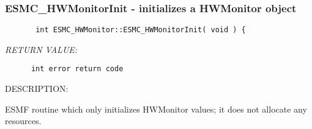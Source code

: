  
\parskip        0pt
\parindent      0pt
\baselineskip  11pt
 
\def\bv{\begin{verbatim}}
\def\ev{\end{verbatim}}
\def\be{\begin{equation}}
\def\ee{\end{equation}}
\def\bea{\begin{eqnarray}}
\def\eea{\end{eqnarray}}
\def\bi{\begin{itemize}}
\def\ei{\end{itemize}}
\def\bn{\begin{enumerate}}
\def\en{\end{enumerate}}
\def\bd{\begin{description}}
\def\ed{\end{description}}
\def\({\left (}
\def\){\right )}
\def\[{\left [}
\def\]{\right ]}
\def\<{\left  \langle}
\def\>{\right \rangle}
\def\cI{{\cal I}}
\def\diag{\mathop{\rm diag}}
\def\tr{\mathop{\rm tr}}


 
\subsubsection{ESMC\_HWMonitorInit - initializes a HWMonitor object}


  
\begin{verbatim}       int ESMC_HWMonitor::ESMC_HWMonitorInit( void ) {\end{verbatim}{\em RETURN VALUE:}
\begin{verbatim}      int error return code\end{verbatim}
{\sf DESCRIPTION:\\ }


        ESMF routine which only initializes HWMonitor values; it does not
        allocate any resources.
   

